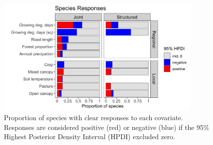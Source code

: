 \documentclass[preprint,review,times,12pt]{elsarticle}
\begin{document}
\begin{figure}
	\centering\includegraphics[width=4in]{ms/1_Ecography/1/figs/b_opt_bar.png}
	\caption{\label{fig:b_bars} Proportion of species with clear responses to each covariate. Responses are considered positive (red) or negative (blue) if the 95\% Highest Posterior Density Interval (HPDI) excluded zero. }
\end{figure}
\end{document}
